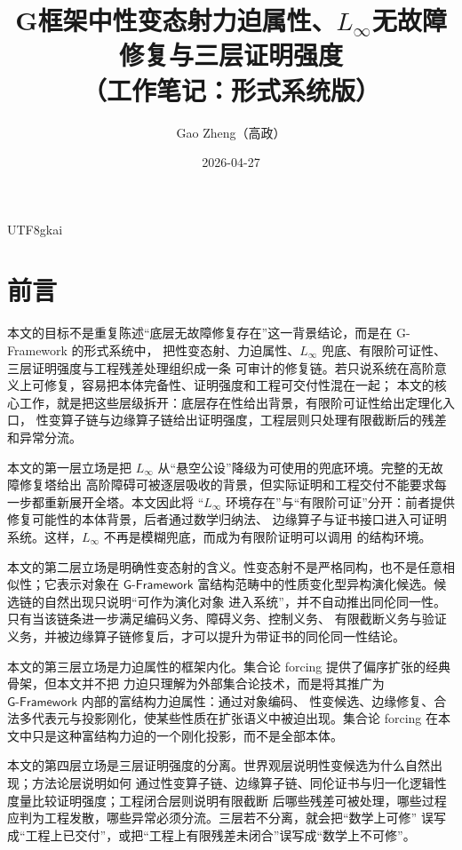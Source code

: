 \documentclass[12pt]{article}
\newcommand{\GFramework}{\textsf{G-Framework}}
\newcommand{\Linfty}{\ensuremath{L_\infty}}
\begin{document}
\begin{CJK*}{UTF8}{gkai}

\title{G框架中性变态射力迫属性、\texorpdfstring{$L_\infty$}{L-infinity}无故障修复与三层证明强度\\（工作笔记：形式系统版）}
\author{Gao Zheng（高政）}
\date{2026-04-27}
\maketitle

\section*{前言}

本文的目标不是重复陈述“底层无故障修复存在”这一背景结论，而是在 \GFramework{} 的形式系统中，
把性变态射、力迫属性、\(\Linfty\) 兜底、有限阶可证性、三层证明强度与工程残差处理组织成一条
可审计的修复链。若只说系统在高阶意义上可修复，容易把本体完备性、证明强度和工程可交付性混在一起；
本文的核心工作，就是把这些层级拆开：底层存在性给出背景，有限阶可证性给出定理化入口，
性变算子链与边缘算子链给出证明强度，工程层则只处理有限截断后的残差和异常分流。

本文的第一层立场是把 \(\Linfty\) 从“悬空公设”降级为可使用的兜底环境。完整的无故障修复塔给出
高阶障碍可被逐层吸收的背景，但实际证明和工程交付不能要求每一步都重新展开全塔。本文因此将
“\(\Linfty\) 环境存在”与“有限阶可证”分开：前者提供修复可能性的本体背景，后者通过数学归纳法、
边缘算子与证书接口进入可证明系统。这样，\(\Linfty\) 不再是模糊兜底，而成为有限阶证明可以调用
的结构环境。

本文的第二层立场是明确性变态射的含义。性变态射不是严格同构，也不是任意相似性；它表示对象在
\(\GFramework{}\) 富结构范畴中的性质变化型异构演化候选。候选链的自然出现只说明“可作为演化对象
进入系统”，并不自动推出同伦同一性。只有当该链条进一步满足编码义务、障碍义务、控制义务、
有限截断义务与验证义务，并被边缘算子链修复后，才可以提升为带证书的同伦同一性结论。

本文的第三层立场是力迫属性的框架内化。集合论 forcing 提供了偏序扩张的经典骨架，但本文并不把
力迫只理解为外部集合论技术，而是将其推广为 \(\GFramework{}\) 内部的富结构力迫属性：通过对象编码、
性变候选、边缘修复、合法多代表元与投影刚化，使某些性质在扩张语义中被迫出现。集合论 forcing
在本文中只是这种富结构力迫的一个刚化投影，而不是全部本体。

本文的第四层立场是三层证明强度的分离。世界观层说明性变候选为什么自然出现；方法论层说明如何
通过性变算子链、边缘算子链、同伦证书与归一化逻辑性度量比较证明强度；工程闭合层则说明有限截断
后哪些残差可被处理，哪些过程应判为工程发散，哪些异常必须分流。三层若不分离，就会把“数学上可修”
误写成“工程上已交付”，或把“工程上有限残差未闭合”误写成“数学上不可修”。


\end{CJK*}
\end{document}
